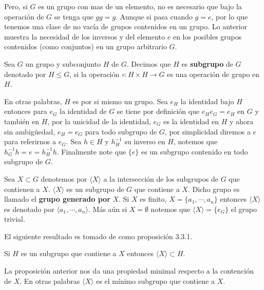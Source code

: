 Pero, si $G$ es un grupo con mas de un elemento, no es necesario que bajo la operación de $G$ se tenga que $gg=g$. Aunque si pasa cuando $g=e$, por lo que tenemos una clase de no vacía de grupos contenidos en un grupo. Lo anterior muestra la necesidad de los inversos y del elemento $e$ en los posibles grupos contenidos (como conjuntos) en un grupo arbitrario $G$.

\begin{df}
Sea $G$ un grupo y subconjunto $H$ de $G$. Decimos que $H$ es \textbf{subgrupo} de $G$ denotado por $H \leq G$, si la operación $\circ:H \times H \to G$ es una operación de grupo en $H$.	
\end{df}

En otras palabras, $H$ es por si mismo un grupo. Sea $e_H$ la identidad bajo $H$ entonces para $e_G$ la identidad de $G$ se tiene por definición que $e_H e_G=e_H$ en $G$ y también en $H$, por la unicidad de la identidad, $e_G$ es la identidad en $H$ y ahora sin ambigüedad, $e_H=e_G$ para todo subgrupo de $G$, por simplicidad diremos a $e$ para referirnos a $e_G$. Sea $h \in H$ y $h_H^{-1}$ su inverso en $H$, notemos que $h_G^{-1}h=e=h_H^{-1}h$. Finalmente note que $\{e\}$ es un subgrupo contenido en todo subgrupo de $G$. 
		
\begin{ob}
Sea $X \subset G$ denotemos por $\langle X \rangle$ a la intersección de los subgrupos de $G$ que contienen a $X$. $\langle X \rangle$ es un subgrupo de $G$ que contiene a $X$. Dicho grupo es llamado el \textbf{grupo generado por} $X$. Si $X$ es finito, $X=\{ a_1, \cdots , a_n\}$ entonces $\langle X \rangle$ es denotado por $\langle a_1, \cdots, a_n \rangle$. Más aún si $X=\emptyset$ notemos que $\langle X \rangle=\{e_G\}$ el grupo trivial.
\end{ob}

El siguiente resultado es tomado de \cite{alg_i} como proposición 3.3.1.

\begin{pr}
Si $H$ es un subgrupo que contiene a $X$ entonces $\langle X \rangle \subset H$.
\end{pr}

La proposición anterior nos da una propiedad minimal respecto a la contención de $X$. En otras palabras $\langle X \rangle$ es el mínimo subgrupo que contiene a $X$.

